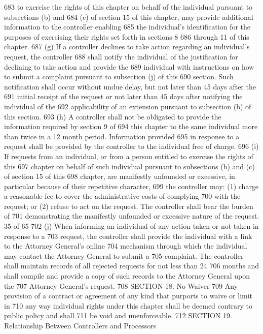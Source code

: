 683 to exercise the rights of this chapter on behalf of the individual pursuant to subsections (b) and
684 (c) of section 15 of this chapter, may provide additional information to the controller enabling
685 the individual’s identification for the purposes of exercising their rights set forth in sections 8
686 through 11 of this chapter.
687 (g) If a controller declines to take action regarding an individual’s request, the controller
688 shall notify the individual of the justification for declining to take action and provide the
689 individual with instructions on how to submit a complaint pursuant to subsection (j) of this
690 section. Such notification shall occur without undue delay, but not later than 45 days after the
691 initial receipt of the request or not later than 45 days after notifying the individual of the
692 applicability of an extension pursuant to subsection (b) of this section.
693 (h) A controller shall not be obligated to provide the information required by section 9 of
694 this chapter to the same individual more than twice in a 12 month period. Information provided
695 in response to a request shall be provided by the controller to the individual free of charge.
696 (i) If requests from an individual, or from a person entitled to exercise the rights of this
697 chapter on behalf of such individual pursuant to subsections (b) and (c) of section 15 of this
698 chapter, are manifestly unfounded or excessive, in particular because of their repetitive character,
699 the controller may: (1) charge a reasonable fee to cover the administrative costs of complying
700 with the request; or (2) refuse to act on the request. The controller shall bear the burden of
701 demonstrating the manifestly unfounded or excessive nature of the request.
35 of 65
702 (j) When informing an individual of any action taken or not taken in response to a
703 request, the controller shall provide the individual with a link to the Attorney General’s online
704 mechanism through which the individual may contact the Attorney General to submit a
705 complaint. The controller shall maintain records of all rejected requests for not less than 24
706 months and shall compile and provide a copy of such records to the Attorney General upon the
707 Attorney General’s request.
708 SECTION 18. No Waiver
709 Any provision of a contract or agreement of any kind that purports to waive or limit in
710 any way individual rights under this chapter shall be deemed contrary to public policy and shall
711 be void and unenforceable.
712 SECTION 19. Relationship Between Controllers and Processors
